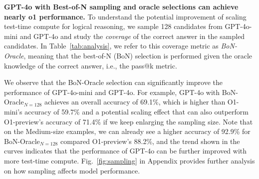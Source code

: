 
\textbf{GPT-4o with Best-of-N sampling and oracle selections can achieve nearly o1 performance.} To understand the potential improvement of scaling test-time compute for logical reasoning, 
we sample 128 candidates from GPT-4o-mini and GPT-4o and study the \textit{coverage} of the correct answer in the sampled candidates.
In Table~\ref{tab:analysis}, we refer to this coverage metric as \textit{BoN-Oracle}, meaning that the best-of-N (BoN) selection is performed given the oracle knowledge of the correct answer, i.e., the pass@k metric.

We observe that the BoN-Oracle selection can significantly improve the performance of GPT-4o-mini and GPT-4o. For example, GPT-4o with BoN-Oracle$_{N=128}$ achieves an overall accuracy of 69.1\%, which is higher than O1-mini's accuracy of 59.7\% and a potential scaling effect that can also outperform O1-preview's accuracy of 71.4\% if we keep enlarging the sampling size. 
Note that on the Medium-size examples, we can already see a higher accuracy of 92.9\% for BoN-Oracle$_{N=128}$ compared O1-preview's 88.2\%, and the trend shown in the curves indicates that the performance of GPT-4o can be further improved with more test-time compute. Fig.~\ref{fig:sampling} in Appendix provides further analysis on how sampling affects model performance.



